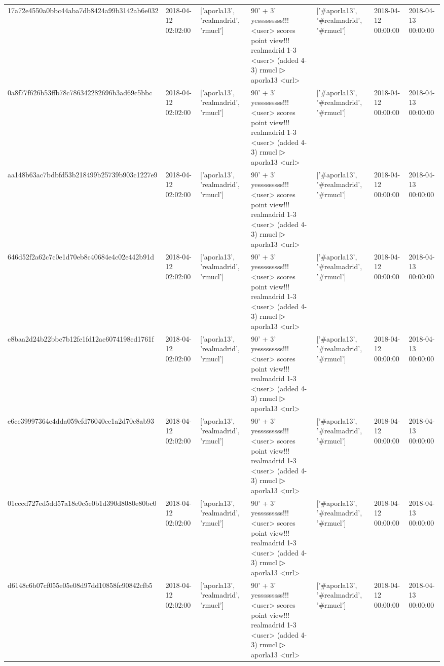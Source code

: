 \begin{tabular}{lllllll}
17a72e4550a0bbc44aba7db8424a99b3142ab6e032 & 2018-04-12 02:02:00 & ['aporla13', 'realmadrid', 'rmucl'] & 90' + 3' yesssssssss!!! <user> scores point view!!! realmadrid 1-3 <user> (added 4-3) rmucl ▷ aporla13 <url> & ['#aporla13', '#realmadrid', '#rmucl'] & 2018-04-12 00:00:00 & 2018-04-13 00:00:00 \\
0a8f77f626b53ffb78c786342282696b3ad69c5bbc & 2018-04-12 02:02:00 & ['aporla13', 'realmadrid', 'rmucl'] & 90' + 3' yesssssssss!!! <user> scores point view!!! realmadrid 1-3 <user> (added 4-3) rmucl ▷ aporla13 <url> & ['#aporla13', '#realmadrid', '#rmucl'] & 2018-04-12 00:00:00 & 2018-04-13 00:00:00 \\
aa148b63ac7bdbfd53b218499b25739b903c1227e9 & 2018-04-12 02:02:00 & ['aporla13', 'realmadrid', 'rmucl'] & 90' + 3' yesssssssss!!! <user> scores point view!!! realmadrid 1-3 <user> (added 4-3) rmucl ▷ aporla13 <url> & ['#aporla13', '#realmadrid', '#rmucl'] & 2018-04-12 00:00:00 & 2018-04-13 00:00:00 \\
646d52f2a62c7c0e1d70eb8c40684e4c02e442b91d & 2018-04-12 02:02:00 & ['aporla13', 'realmadrid', 'rmucl'] & 90' + 3' yesssssssss!!! <user> scores point view!!! realmadrid 1-3 <user> (added 4-3) rmucl ▷ aporla13 <url> & ['#aporla13', '#realmadrid', '#rmucl'] & 2018-04-12 00:00:00 & 2018-04-13 00:00:00 \\
c8baa2d24b22bbc7b12fe1fd12ac6074198cd1761f & 2018-04-12 02:02:00 & ['aporla13', 'realmadrid', 'rmucl'] & 90' + 3' yesssssssss!!! <user> scores point view!!! realmadrid 1-3 <user> (added 4-3) rmucl ▷ aporla13 <url> & ['#aporla13', '#realmadrid', '#rmucl'] & 2018-04-12 00:00:00 & 2018-04-13 00:00:00 \\
e6ce39997364e4dda059cfd76040ce1a2d70c8ab93 & 2018-04-12 02:02:00 & ['aporla13', 'realmadrid', 'rmucl'] & 90' + 3' yesssssssss!!! <user> scores point view!!! realmadrid 1-3 <user> (added 4-3) rmucl ▷ aporla13 <url> & ['#aporla13', '#realmadrid', '#rmucl'] & 2018-04-12 00:00:00 & 2018-04-13 00:00:00 \\
01cccd727ed5dd57a18e0c5e0b1d390d8080e80bc0 & 2018-04-12 02:02:00 & ['aporla13', 'realmadrid', 'rmucl'] & 90' + 3' yesssssssss!!! <user> scores point view!!! realmadrid 1-3 <user> (added 4-3) rmucl ▷ aporla13 <url> & ['#aporla13', '#realmadrid', '#rmucl'] & 2018-04-12 00:00:00 & 2018-04-13 00:00:00 \\
d6148c6b07cf055e05e08d97dd10858fc90842cfb5 & 2018-04-12 02:02:00 & ['aporla13', 'realmadrid', 'rmucl'] & 90' + 3' yesssssssss!!! <user> scores point view!!! realmadrid 1-3 <user> (added 4-3) rmucl ▷ aporla13 <url> & ['#aporla13', '#realmadrid', '#rmucl'] & 2018-04-12 00:00:00 & 2018-04-13 00:00:00 \\

\end{tabular}
